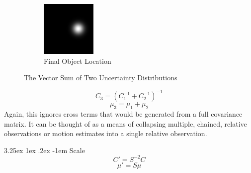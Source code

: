 \documentclass[a4paper, 11pt, titlepage]{article}
\makeatletter
\renewcommand\paragraph{\@startsection{paragraph}{5}{\z@}%
  {3.25ex \@plus1ex \@minus.2ex}%
  {-1em}%
  {\normalfont\normalsize\bfseries}}
\makeatother
\begin{document}
\begin{figure}
\begin{subfigure}{.3\textwidth}
        \end{subfigure}
        \begin{subfigure}{.3\textwidth}
          \centering
          \includegraphics[width=.8\linewidth]{images/GaussianSum3.png}
          \caption{Final Object Location}
          \label{fig:vectSumsub3}
        \end{subfigure}
        \caption{The Vector Sum of Two Uncertainty Distributions}
        \label{fig:vectSum}
        \end{figure}
        \begin{equation}
        C_3 = (C_1^{-1} + C_2^{-1})^{-1}
        \end{equation}
        \begin{equation}
        \mu_3 = \mu_1 + \mu_2
        \end{equation}
        Again, this ignores cross terms that would be generated from a full covariance matrix.  It can be thought of as a means of collapsing multiple, chained, relative observations or motion estimates into a single relative observation.

        \paragraph{Scale}
        \begin{equation}
        C' = S^{-2} C
        \end{equation}
        \begin{equation}
        \mu' = S \mu
        \end{equation}
\end{document}

